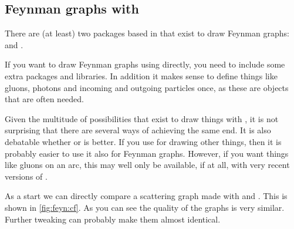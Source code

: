 \subsection{Feynman graphs with \TikZ}%
\label{sec:fig:feynman:tikz}

There are (at least) two packages based in \TikZ that exist to draw Feynman graphs:
 and .

If you want to draw Feynman graphs using \TikZ directly,
you need to include some extra \TikZ packages and libraries.
In addition it makes sense to
define things like gluons, photons and incoming and outgoing particles
once, as these are objects that are often needed.

Given the multitude of possibilities that exist to draw things with
\TikZ, it is not surprising that there are several ways of achieving the
same end. It is also debatable whether  or 
is better. If you use \TikZ for drawing other things, then it is
probably easier to use it also for Feynman graphs. However, if you
want things like gluons on an arc, this may well only be available, if
at all, with very recent versions of .

As a start we can directly compare a scattering graph made with
 and . This is shown in
\cref{fig:feyn:cf}. As you can see the quality of the graphs is
very similar. Further tweaking can probably make them almost
identical.

